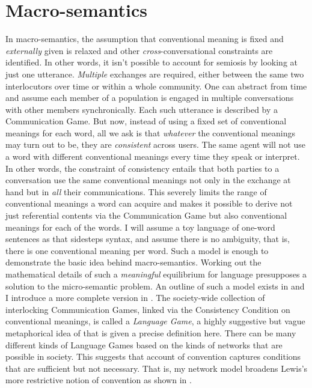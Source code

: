 \section{Macro-semantics} \label{sec:macro-semantics}

In macro-semantics, the assumption that conventional meaning is fixed and \emph{externally} given is relaxed and other \emph{cross}-conversational constraints are identified. In other words, it isn't possible to account for semiosis by looking at just one utterance. \emph{Multiple} exchanges are required, either between the same two interlocutors over time or within a whole community. One can abstract from time and assume each member of a population is engaged in multiple conversations with other members synchronically. Each such utterance is described by a Communication Game. But now, instead of using a fixed set of conventional meanings for each word, all we ask is that \emph{whatever} the conventional meanings may turn out to be, they are \emph{consistent} across users. The same agent will not use a word with different conventional meanings every time they speak or interpret. In other words, the constraint of consistency entails that both parties to a conversation use the same conventional meanings not only in the exchange at hand but in \emph{all} their communications. This severely limits the range of conventional meanings a word can acquire and makes it possible to derive not just referential contents via the Communication Game but also conventional meanings for each of the words. I will assume a toy language of one-word sentences as that sidesteps syntax, and assume there is no ambiguity, that is, there is one conventional meaning per word. Such a model is enough to demonstrate the basic idea behind macro-semantics. Working out the mathematical details of such a \emph{meaningful} equilibrium for language presupposes a solution to the micro-semantic problem. An outline of such a model exists in \citet{parikh:note} and I introduce a more complete version in . The society-wide collection of interlocking Communication Games, linked via the Consistency Condition on conventional meanings, is called a \emph{Language Game}, a highly suggestive but vague metaphorical idea of  that is given a precise definition here. There can be many different kinds of Language Games based on the kinds of networks that are possible in society. This suggests that  account of convention captures conditions that are sufficient but not necessary. That is, my network model broadens Lewis's more restrictive notion of convention as shown in .

